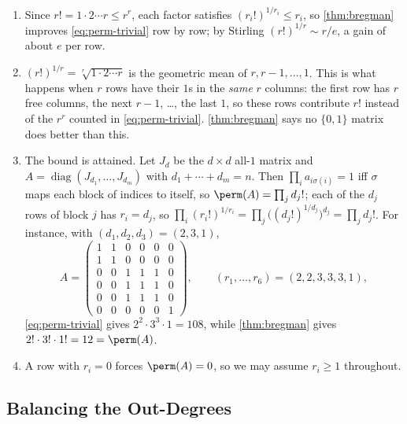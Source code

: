 \begin{remark}\hfill
    \begin{enumerate}[(1)]
        \item Since \(r! = 1 \cdot 2 \cdots r \le r^r\), each factor satisfies \((r_i!)^{1/r_i} \le r_i\), so \autoref{thm:bregman} improves \eqref{eq:perm-trivial} row by row; by Stirling \((r!)^{1/r} \sim r/e\), a gain of about \(e\) per row.
        \item \((r!)^{1/r} = \sqrt[r]{1 \cdot 2 \cdots r}\) is the geometric mean of \(r, r-1, \ldots, 1\). This is what happens when \(r\) rows have their \(1\)s in the \emph{same} \(r\) columns: the first row has \(r\) free columns, the next \(r-1\), \ldots, the last \(1\), so these rows contribute \(r!\) instead of the \(r^r\) counted in \eqref{eq:perm-trivial}. \autoref{thm:bregman} says no \(\{0,1\}\) matrix does better than this.
        \item The bound is attained. Let \(J_d\) be the \(d \times d\) all-\(1\) matrix and \(A = \operatorname{diag}(J_{d_1}, \ldots, J_{d_m})\) with \(d_1 + \cdots + d_m = n\). Then \(\prod_i a_{i\sigma(i)} = 1\) iff \(\sigma\) maps each block of indices to itself, so \(\perm(A) = \prod_j d_j!\); each of the \(d_j\) rows of block \(j\) has \(r_i = d_j\), so \(\prod_i (r_i!)^{1/r_i} = \prod_j \bigl( (d_j!)^{1/d_j} \bigr)^{d_j} = \prod_j d_j!\). For instance, with \((d_1, d_2, d_3) = (2, 3, 1)\),
        \[
            A = \left( \begin{array}{cc|ccc|c}
                1 & 1 & 0 & 0 & 0 & 0 \\
                1 & 1 & 0 & 0 & 0 & 0 \\ \hline
                0 & 0 & 1 & 1 & 1 & 0 \\
                0 & 0 & 1 & 1 & 1 & 0 \\
                0 & 0 & 1 & 1 & 1 & 0 \\ \hline
                0 & 0 & 0 & 0 & 0 & 1
            \end{array} \right),
            \qquad (r_1, \ldots, r_6) = (2, 2, 3, 3, 3, 1),
        \]
        \eqref{eq:perm-trivial} gives \(2^2 \cdot 3^3 \cdot 1 = 108\), while \autoref{thm:bregman} gives \(2! \cdot 3! \cdot 1! = 12 = \perm(A)\).
        \item A row with \(r_i = 0\) forces \(\perm(A) = 0\), so we may assume \(r_i \ge 1\) throughout.
    \end{enumerate}
\end{remark}

\subsection{Balancing the Out-Degrees}

